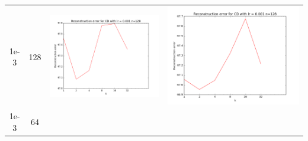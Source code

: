 \documentclass[12pt]{report}
\begin{document}
\begin{table}[H]
\begin{tabular}{ | c | c | c | c |}
\begin{minipage}{.3\textwidth}
    \end{minipage}
    \\ \hline
    1e-3 & 128 &
    \begin{minipage}{.3\textwidth}
    \includegraphics[scale=0.2]{train_cd_lr_0_001_n_128.png}
    \end{minipage} &
    \begin{minipage}{.3\textwidth}
      \includegraphics[scale=0.2]{cd_lr_0_001_n_128.png}
    \end{minipage}
    \\ \hline
    1e-3 & 64 &
    \begin{minipage}{.3\textwidth}

\end{minipage}
\end{tabular}
\end{table}
\end{document}
